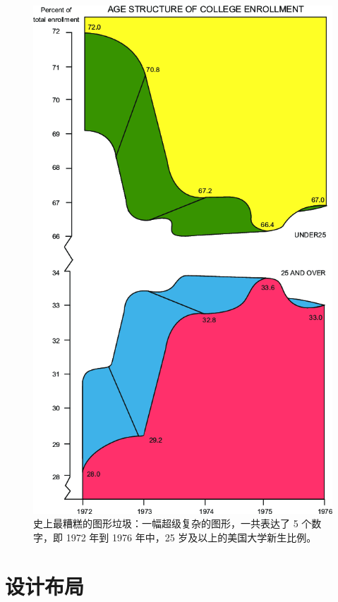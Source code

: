 \documentclass[
  b5paper,
  UTF8,twoside]{book}
\begin{document}
\begin{figure}

{\centering \includegraphics{images/worst-graph} 

}

\caption[史上最糟糕的图形垃圾]{史上最糟糕的图形垃圾：一幅超级复杂的图形，一共表达了 5 个数字，即 1972 年到 1976 年中，25 岁及以上的美国大学新生比例。}\label{fig:worst-graph}
\end{figure}



\hypertarget{ux8bbeux8ba1ux5e03ux5c40}{%
\section{设计布局}\label{ux8bbeux8ba1ux5e03ux5c40}}
\end{document}
